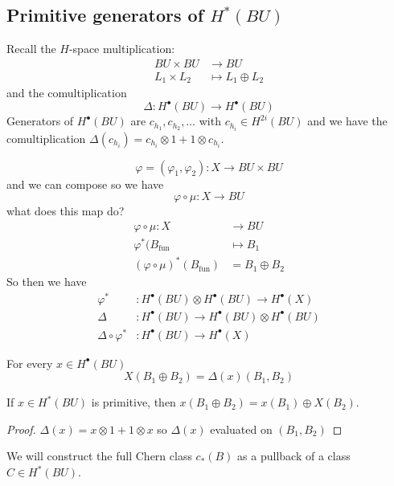 \subsection{Primitive generators of $H^{*}(BU)$}

Recall the $H$-space multiplication:
\begin{align*}
	BU\times BU  &\longrightarrow BU \\
	L_1\times L_2 &\longmapsto L_1\oplus L_2
\end{align*}
and the comultiplication
\[\Delta :H^{\bullet}(BU)\to H^{\bullet}(BU)\]
Generators of $H^{\bullet}(BU)$ are $c_{h_1},c_{h_2},\ldots$ with $c_{h_i}\in H^{2i}(BU)$ and we have the comultiplication $\Delta(c_{h_i})=c_{h_i}\otimes 1+1\otimes c_{h_i}$.

\begin{remark}
	\[\varphi=(\varphi_1,\varphi_2):X\to BU\times BU\]
	and we can compose so we have
	\[\varphi\circ \mu:X\to BU\]
	what does this map do?
	\begin{align*}
		\varphi\circ \mu: X &\longrightarrow BU \\
		\varphi^* (B_{\operatorname{fun}} &\longmapsto B_1\\
		(\varphi\circ \mu)^* (B_{\operatorname{ fu n}})&=B_1\oplus B_2
	\end{align*}
	So then we have
	\begin{align*}
		\varphi^*&:H^{\bullet}(BU)\otimes H^{\bullet}(BU)\to H^{\bullet}(X)\\
		\Delta &:H^{\bullet}(BU)\to H^{\bullet}(BU)\otimes H^{\bullet}(BU)\\
		\Delta \circ \varphi^*&:H^{\bullet}(BU)\to H^{\bullet}(X)
	\end{align*}
\end{remark}

\begin{coro}
		For every $x \in H^{\bullet}(BU)$
		\[X(B_1\oplus B_2)=\Delta(x)(B_1,B_2)\]
	\end{coro}

	\begin{coro}
		If $x\in H^{*}(BU)$ is primitive, then $x(B_1\oplus B_2)=x(B_1)\oplus X(B_2)$.
	\end{coro}

	\begin{proof}
		$\Delta(x)=x\otimes 1+1\otimes x$ so $\Delta(x)$ evaluated on $(B_1,B_2)$
	\end{proof}

	\begin{remark}
	We will construct the full Chern class $c_*(B)$ as a pullback of a class $C\in H^{*}(BU)$.
\end{remark}

